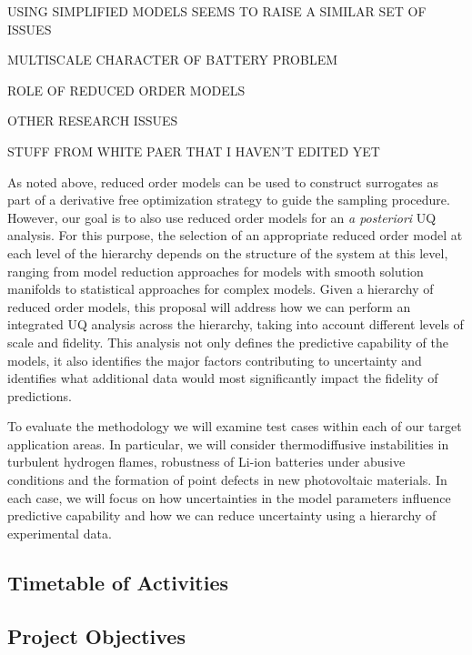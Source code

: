 \documentclass[11pt]{article}
\begin{document}
USING SIMPLIFIED MODELS SEEMS TO RAISE A SIMILAR SET OF ISSUES

MULTISCALE CHARACTER OF BATTERY PROBLEM

ROLE OF REDUCED ORDER MODELS

OTHER RESEARCH ISSUES

STUFF FROM WHITE PAER THAT I HAVEN'T EDITED YET

As noted above, reduced order models can be used to construct surrogates as part of a derivative free optimization strategy
to guide the sampling procedure. However, our goal is to also use reduced order models for an {\it {a posteriori}} UQ analysis.
For this purpose, the selection of an appropriate reduced order model at each level of the hierarchy depends on the
structure of the system at this level, ranging from model reduction approaches for models with smooth solution manifolds
to statistical approaches for complex models.
Given a hierarchy of reduced order models, this proposal will address how we can perform an integrated UQ analysis 
across the hierarchy, taking into account different levels of scale and fidelity.
This analysis not only defines the predictive capability of the models, it also identifies
the major factors contributing to uncertainty and identifies what additional data would most significantly
impact the fidelity of predictions.

To evaluate the methodology we will examine test cases within each of our target application areas.  In particular,
we will consider thermodiffusive instabilities in turbulent hydrogen flames, robustness of Li-ion batteries under abusive conditions
and the formation of point defects in new photovoltaic materials.  In each case, we will focus on how uncertainties in the 
model parameters influence predictive capability and how we can reduce uncertainty using a hierarchy of experimental data.


\subsection*{Timetable of Activities}

\subsection*{Project Objectives}
\end{document}
